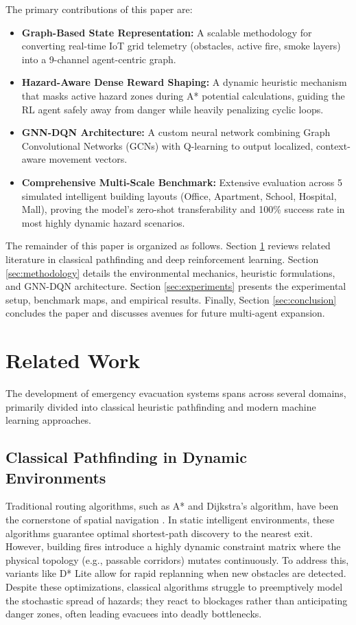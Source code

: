 \documentclass[conference]{IEEEtran}
\begin{document}
The primary contributions of this paper are:
\begin{itemize}
    \item \textbf{Graph-Based State Representation:} A scalable methodology for converting real-time IoT grid telemetry (obstacles, active fire, smoke layers) into a 9-channel agent-centric graph.
    \item \textbf{Hazard-Aware Dense Reward Shaping:} A dynamic heuristic mechanism that masks active hazard zones during A* potential calculations, guiding the RL agent safely away from danger while heavily penalizing cyclic loops.
    \item \textbf{GNN-DQN Architecture:} A custom neural network combining Graph Convolutional Networks (GCNs) with Q-learning to output localized, context-aware movement vectors.
    \item \textbf{Comprehensive Multi-Scale Benchmark:} Extensive evaluation across 5 simulated intelligent building layouts (Office, Apartment, School, Hospital, Mall), proving the model's zero-shot transferability and 100\% success rate in most highly dynamic hazard scenarios.
\end{itemize}

The remainder of this paper is organized as follows. Section \ref{sec:related_work} reviews related literature in classical pathfinding and deep reinforcement learning. Section \ref{sec:methodology} details the environmental mechanics, heuristic formulations, and GNN-DQN architecture. Section \ref{sec:experiments} presents the experimental setup, benchmark maps, and empirical results. Finally, Section \ref{sec:conclusion} concludes the paper and discusses avenues for future multi-agent expansion.

\section{Related Work}
\label{sec:related_work}
The development of emergency evacuation systems spans across several domains, primarily divided into classical heuristic pathfinding and modern machine learning approaches.

\subsection{Classical Pathfinding in Dynamic Environments}
Traditional routing algorithms, such as A* and Dijkstra's algorithm, have been the cornerstone of spatial navigation \cite{astar_evacuation}. In static intelligent environments, these algorithms guarantee optimal shortest-path discovery to the nearest exit. However, building fires introduce a highly dynamic constraint matrix where the physical topology (e.g., passable corridors) mutates continuously. To address this, variants like D* Lite \cite{koenig2002d} allow for rapid replanning when new obstacles are detected. Despite these optimizations, classical algorithms struggle to preemptively model the stochastic spread of hazards; they react to blockages rather than anticipating danger zones, often leading evacuees into deadly bottlenecks.
\end{document}
